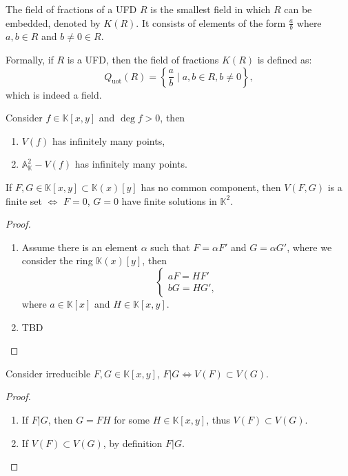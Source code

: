 \documentclass[10pt]{article}
\begin{document}
\begin{definition}
  The field of fractions of a UFD $ R$ is the smallest field in which $ R$ can be embedded, denoted by $ K(R)$.
  It consists of elements of the form $ \frac{a}{b}$ where $ a, b \in R$ and $ b \neq 0 \in R$.

  Formally, if $ R$ is a UFD, then the field of fractions $ K(R)$ is defined as:
  \begin{equation*}
    Q_{\mathrm{uot}}(R) = \left\{ \frac{a}{b} \mid a, b \in R, b \neq 0 \right\},
  \end{equation*}
  which is indeed a field.
\end{definition}

\begin{lemma}
  Consider $ f \in \mathbb{K}[x,y]$ and $ \deg f > 0$, then
  \begin{enumerate}[(1)]
    \item $ V(f)$ has infinitely many points,
    \item $ \mathbb{A}^{2}_{\mathbb{K}} - V(f)$ has infinitely many points.
  \end{enumerate}
\end{lemma}

\begin{theorem}
  If $ F, G \in \mathbb{K}[x,y] \subset \mathbb{K}(x)[y]$ has no common component, then $ V(F,G)$ is a finite set $\Leftrightarrow$ $ F=0$, $ G = 0$ have finite solutions in $ \mathbb{K}^{2}$.
\end{theorem}
\begin{proof}
  \begin{enumerate}[(1)]
    \item Assume there is an element $ \alpha$ such that $ F = \alpha F'$ and $ G = \alpha G'$, where we consider the ring $ \mathbb{K}(x)[y]$, then
      \begin{equation*}
        \begin{cases}
          a F = H F'\\
          b G = H G',
        \end{cases}
      \end{equation*}
      where $ a \in \mathbb{K}[x]$ and $ H \in \mathbb{K}[x,y]$.
    \item TBD
  \end{enumerate}
\end{proof}

\begin{theorem}
  Consider irreducible $ F, G \in \mathbb{K}[x,y]$, $ F | G \Leftrightarrow V(F) \subset V(G)$.
\end{theorem}
\begin{proof}
  \begin{enumerate}[(1)]
    \item If $ F | G$, then $ G = F H$ for some $ H \in \mathbb{K}[x,y]$, thus $ V(F) \subset V(G)$.
    \item If $ V(F) \subset V(G)$, by definition $ F | G$.
  \end{enumerate}
\end{proof}
\end{document}
